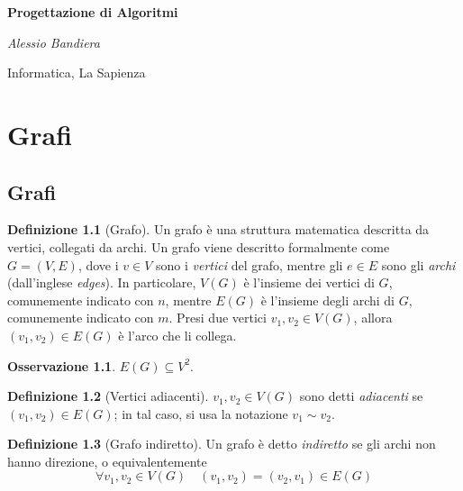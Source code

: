 \documentclass[14pt]{extreport}
\theoremstyle{definition}
\newtheorem{definition}{Definizione}[section]
\theoremstyle{definition}
\newtheorem{remark}{Osservazione}[section]
\begin{document}
\begin{titlepage}
    \centering
    \vspace*{1cm}

    \textbf{\huge Progettazione di Algoritmi}

    \vspace{1.5cm}

    \textit{\Large Alessio Bandiera}

    \vfill
        
    \large Informatica, La Sapienza
\end{titlepage}

\tableofcontents

\pagebreak


\chapter{Grafi}

\section{Grafi}

\begin{definition}[Grafo]
    Un grafo è una struttura matematica descritta da vertici, collegati da archi. Un grafo viene descritto formalmente come $G=(V, E)$, dove i $v \in V$ sono i \textit{vertici} del grafo, mentre gli $e \in E$ sono gli \textit{archi} (dall'inglese \textit{edges}). In particolare, $V(G)$ è l'insieme dei vertici di $G$, comunemente indicato con $n$, mentre $E(G)$ è l'insieme degli archi di $G$, comunemente indicato con $m$. Presi due vertici $v_1,v_2 \in V(G)$, allora $(v_1, v_2) \in E(G)$ è l'arco che li collega.
\end{definition}

\begin{remark}
    $E(G) \subseteq V^2$.
\end{remark}

\begin{definition}[Vertici adiacenti]
    $v_1, v_2 \in V(G)$ sono detti \textit{adiacenti} se $(v_1, v_2) \in E(G)$; in tal caso, si usa la notazione $v_1 \sim v_2$.
\end{definition}

\begin{definition}[Grafo indiretto]
    Un grafo è detto \textit{indiretto} se gli archi non hanno direzione, o equivalentemente $$\forall v_1, v_2 \in V(G) \quad (v_1, v_2) = (v_2, v_1) \in E(G)$$
\end{definition}
\end{document}
